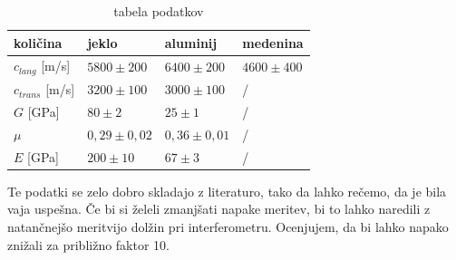 \documentclass[12pt]{article}
\begin{document}
\begin{table}[h]
    \begin{center}
    \begin{tabular}{l|l|l|l}
    količina              & jeklo          & aluminij       & medenina      \\\hline
    $c_{lang}$ {[}m/s{]}  & $5800\pm 200$  & $6400\pm 200$  & $4600\pm 400$ \\
    $c_{trans}$ {[}m/s{]} & $3200\pm 100$  & $3000\pm 100$  & /             \\
    $G$ {[}GPa{]}         & $80\pm 2$      & $25\pm 1$      & /             \\
    $\mu$                 & $0,29\pm 0,02$ & $0,36\pm 0,01$ & /             \\
    $E$ {[}GPa{]}         & $200\pm 10$    & $67\pm 3$      & /            
    \end{tabular}
    \caption{tabela podatkov}
    \end{center}
\end{table}
\newpage
Te podatki se zelo dobro skladajo z literaturo, tako da lahko rečemo, da je bila vaja uspešna. Če bi si želeli zmanjšati napake meritev, bi to lahko naredili z natančnejšo meritvijo dolžin pri interferometru. Ocenjujem, da bi lahko napako znižali za približno faktor 10.
\end{document}
